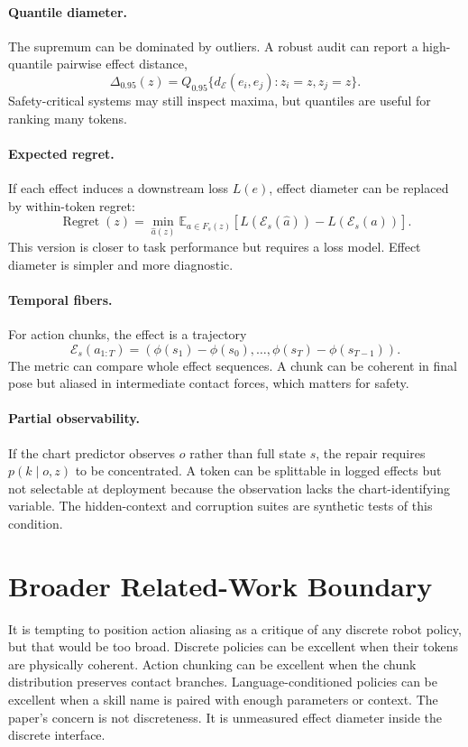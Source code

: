 \documentclass{article}
\newcommand{\E}{\mathcal{E}}
\newcommand{\EE}{\mathbb{E}}
\begin{document}
\paragraph{Quantile diameter.}
The supremum can be dominated by outliers. A robust audit can report a
high-quantile pairwise effect distance,
\[
    \Delta_{0.95}(z)=
    Q_{0.95}\{d_\E(e_i,e_j):z_i=z,z_j=z\}.
\]
Safety-critical systems may still inspect maxima, but quantiles are useful for
ranking many tokens.

\paragraph{Expected regret.}
If each effect induces a downstream loss $L(e)$, effect diameter can be replaced
by within-token regret:
\[
    \operatorname{Regret}(z)
    =
    \min_{\hat a(z)}
    \EE_{a\in F_s(z)}
    \left[L(\E_s(\hat a))-L(\E_s(a))\right].
\]
This version is closer to task performance but requires a loss model. Effect
diameter is simpler and more diagnostic.

\paragraph{Temporal fibers.}
For action chunks, the effect is a trajectory
\[
    \E_s(a_{1:T})=(\phi(s_1)-\phi(s_0),\ldots,\phi(s_T)-\phi(s_{T-1})).
\]
The metric can compare whole effect sequences. A chunk can be coherent in final
pose but aliased in intermediate contact forces, which matters for safety.

\paragraph{Partial observability.}
If the chart predictor observes $o$ rather than full state $s$, the repair
requires $p(k\mid o,z)$ to be concentrated. A token can be splittable in logged
effects but not selectable at deployment because the observation lacks the
chart-identifying variable. The hidden-context and corruption suites are
synthetic tests of this condition.

\section{Broader Related-Work Boundary}

It is tempting to position action aliasing as a critique of any discrete robot
policy, but that would be too broad. Discrete policies can be excellent when
their tokens are physically coherent. Action chunking can be excellent when the
chunk distribution preserves contact branches. Language-conditioned policies
can be excellent when a skill name is paired with enough parameters or context.
The paper's concern is not discreteness. It is unmeasured effect diameter inside
the discrete interface.
\end{document}
